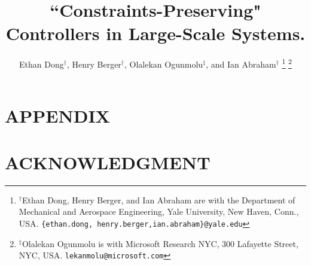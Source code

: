 \documentclass[letterpaper, 10 pt, conference]{ieeeconf}  %
\title{\LARGE \bf
``Constraints-Preserving" Controllers in Large-Scale Systems.}
\author{Ethan Dong$^{\dagger}$, Henry Berger$^{\dagger}$,  Olalekan Ogunmolu$^{\ddagger}$, and Ian Abraham$^{\dagger}$
\thanks{$^{\dagger}$Ethan Dong, Henry Berger, and Ian Abraham are with the Department of Mechanical and Aerospace Engineering, Yale University, New Haven, Conn., USA.
{\tt\small \{ethan.dong, henry.berger,ian.abraham\}@yale.edu}}%
\thanks{$^{\ddagger}$Olalekan Ogunmolu  is with Microsoft Research NYC, 300 Lafayette Street, NYC, USA. {\tt\small lekanmolu@microsoft.com}}%
}
\numberwithin{equation}{section}
\begin{document}
\maketitle
\thispagestyle{empty}
\pagestyle{empty}









\addtolength{\textheight}{-12cm}   %







\section*{APPENDIX}

\section*{ACKNOWLEDGMENT}



	
\end{document}
